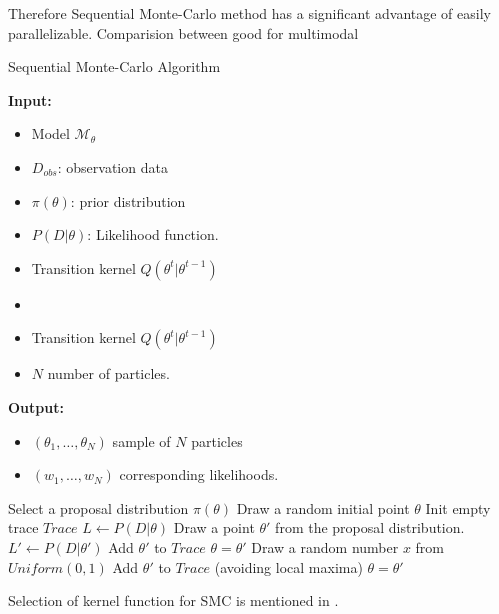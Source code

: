 Therefore Sequential Monte-Carlo method has a significant advantage of easily
parallelizable. Comparision between \cite{daviet2018inference}
good for multimodal
\begin{algorithm}[H]
    \caption{Sequential Monte-Carlo Algorithm}
    \label{alg:smc}
    \hspace*{\algorithmicindent} \textbf{Input:}
    \begin{itemize}
        \item Model $\mathcal{M}_\theta$
        \item $D_{obs}$: observation data
        \item $\pi(\theta)$: prior distribution
        \item $P(D|\theta)$: Likelihood function.
        \item Transition kernel $Q(\theta^t|\theta^{t-1})$
        \item \item Transition kernel $Q(\theta^t|\theta^{t-1})$
        \item $N$ number of particles.
    \end{itemize}
    \hspace*{\algorithmicindent} \textbf{Output:}
    \begin{itemize}
        \item $(\theta_1,\ldots,\theta_N)$ sample of $N$ particles
        \item $(w_1,\ldots,w_N)$ corresponding likelihoods.
    \end{itemize}
    \begin{algorithmic}[1]
        \State Select a proposal distribution $\pi(\theta)$
        \State Draw a random initial point $\theta$
        \State Init empty trace $Trace$
        \State $L \leftarrow P(D|\theta)$
        \State Draw a point $\theta' $ from the proposal distribution.
        \State $L' \leftarrow P(D|\theta')$
        \State Add $\theta'$ to $Trace$
        \State $\theta = \theta'$
        \Else
        \State Draw a random number $x$ from $Uniform(0,1)$
        \State Add $\theta'$ to $Trace$ (avoiding local maxima)
        \State $\theta = \theta'$
        \EndIf
        \EndIf
        \EndWhile
        \EndProcedure
    \end{algorithmic}
\end{algorithm}
Selection of kernel function for SMC is mentioned in \cite{silk2012optimizing}.

